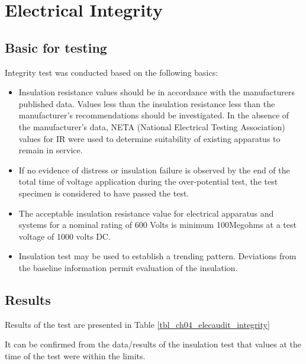 \section{Electrical Integrity} \label{ch04_elecaudit_integrity}

\subsection{Basic for testing}
Integrity test was conducted based on the following basics:

\begin{itemize}
\item Insulation resistance values should be in accordance with the manufacturers published data. Values less than the insulation resistance less than the manufacturer’s recommendations should be investigated. In the absence of the manufacturer’s data, NETA (National Electrical Testing Association) values for IR were  used to determine suitability of existing apparatus to remain in service.

\item If no evidence of distress or insulation failure is observed by the end of the total time of voltage application during the over-potential test, the test specimen is considered to have passed the test. 

\item The acceptable insulation resistance value for electrical apparatus and systems for a nominal rating of 600 Volts is minimum 100Megohms at a test voltage of 1000 volts DC.

\item Insulation test may be used to establish a trending pattern. Deviations from the baseline information permit evaluation of the insulation.


\end{itemize}

\subsection{Results}
Results of the test are presented in Table \ref{tbl_ch04_elecaudit_integrity}



It can be confirmed from the data/results of the insulation test that values at the time of the test were within the limits.

